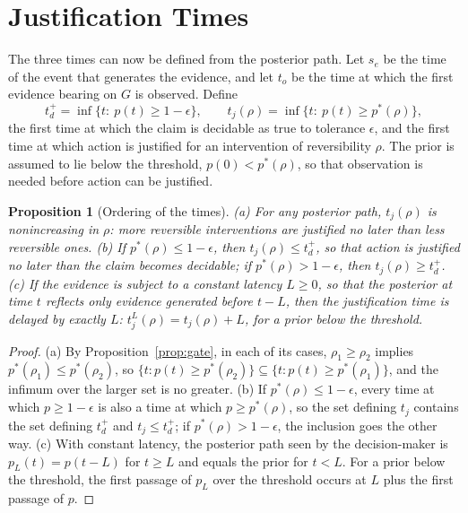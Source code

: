 \documentclass[11pt,twoside,openright]{book}
\theoremstyle{plain}
\newtheorem{proposition}[theorem]{Proposition}
\theoremstyle{definition}
\theoremstyle{remark}
\begin{document}
\section{Justification Times}

The three times can now be defined from the posterior path. Let $s_e$ be the time of the event that generates the evidence, and let $t_o$ be the time at which the first evidence bearing on $G$ is observed. Define
\[
t_d^{+}=\inf\{t:\ p(t)\ge1-\epsilon\},\qquad t_j(\rho)=\inf\{t:\ p(t)\ge p^*(\rho)\},
\]
the first time at which the claim is decidable as true to tolerance $\epsilon$, and the first time at which action is justified for an intervention of reversibility $\rho$. The prior is assumed to lie below the threshold, $p(0)<p^*(\rho)$, so that observation is needed before action can be justified.

\begin{proposition}[Ordering of the times]\label{prop:times}
(a) For any posterior path, $t_j(\rho)$ is nonincreasing in $\rho$: more reversible interventions are justified no later than less reversible ones. (b) If $p^*(\rho)\le1-\epsilon$, then $t_j(\rho)\le t_d^{+}$, so that action is justified no later than the claim becomes decidable; if $p^*(\rho)>1-\epsilon$, then $t_j(\rho)\ge t_d^{+}$. (c) If the evidence is subject to a constant latency $L\ge0$, so that the posterior at time $t$ reflects only evidence generated before $t-L$, then the justification time is delayed by exactly $L$: $t_j^{L}(\rho)=t_j(\rho)+L$, for a prior below the threshold.
\end{proposition}

\begin{proof}
(a) By Proposition~\ref{prop:gate}, in each of its cases, $\rho_1\ge\rho_2$ implies $p^*(\rho_1)\le p^*(\rho_2)$, so $\{t:p(t)\ge p^*(\rho_2)\}\subseteq\{t:p(t)\ge p^*(\rho_1)\}$, and the infimum over the larger set is no greater. (b) If $p^*(\rho)\le1-\epsilon$, every time at which $p\ge1-\epsilon$ is also a time at which $p\ge p^*(\rho)$, so the set defining $t_j$ contains the set defining $t_d^{+}$ and $t_j\le t_d^{+}$; if $p^*(\rho)>1-\epsilon$, the inclusion goes the other way. (c) With constant latency, the posterior path seen by the decision-maker is $p_L(t)=p(t-L)$ for $t\ge L$ and equals the prior for $t<L$. For a prior below the threshold, the first passage of $p_L$ over the threshold occurs at $L$ plus the first passage of $p$.
\end{proof}
\end{document}
